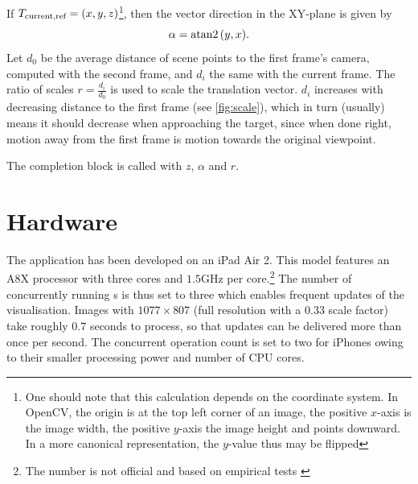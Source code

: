 If $T_{\text{current,ref}} = (x,y,z)$\footnote{One should note that this
   calculation depends on the coordinate system. In OpenCV, the origin is at the
   top left corner of an image, the positive $x$-axis is the image width, the
   positive $y$-axis the image height and points downward. In a more canonical
representation, the $y$-value thus may be flipped}, then the vector direction
in the XY-plane is given by 
\begin{equation*}
   \alpha = \atan2{(y,x)}.
\end{equation*}
Let $d_0$ be the average distance of scene points to the first frame's camera,
computed with the second frame, and $d_i$ the same with the current frame. The
ratio of scales $r=\frac{d_i}{d_0}$ is used to scale the translation vector. $d_i$
increases with decreasing distance to the first frame (see \autoref{fig:scale}),
which in turn (usually) means it should decrease when approaching the target,
since when done right, motion away from the first frame is motion towards the
original viewpoint.

The completion block is called with $z$, $\alpha$ and $r$.

\section{Hardware}

The application has been developed on an iPad Air 2. This model features an
A8X processor with three cores and $1.5$GHz per core.\footnote{The number is not
official and based on empirical tests \citep{a8x}} The number of concurrently
running s is thus set to three which
enables frequent updates of the visualisation. Images with $1077\times 807$
(full resolution with a $0.33$ scale factor) take roughly $0.7$ seconds to
process, so that updates can be delivered more than once per second. The
concurrent operation count is set to two for iPhones owing to their smaller
processing power and number of CPU cores.

